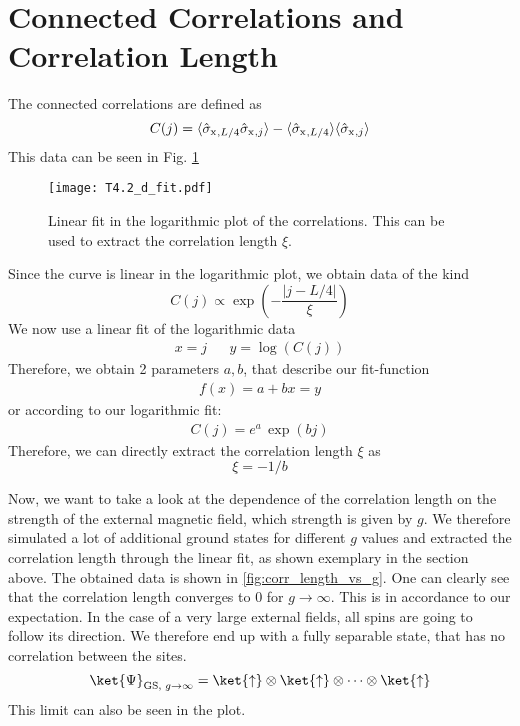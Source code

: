 \section{Connected Correlations and Correlation Length}
The connected correlations are defined as 
\begin{equation}
    C(j) = \langle \sigmax{}_{,L/4}\sigmax{}_{,j}\rangle - \langle \sigmax{}_{,L/4}\rangle\langle\sigmax{}_{,j}\rangle
\end{equation}
This data can be seen  in Fig. \ref{fig:connected-corr}
\begin{figure}[htbp]
    \centering
    \texttt{[image: T4.2\_d\_fit.pdf]}
    \caption{Linear fit in the logarithmic plot of the correlations. This can be used to extract the correlation length $\xi$.}
    \label{fig:connected-corr}
\end{figure}
Since the curve is linear in the logarithmic plot, we obtain data of the kind
\begin{equation}
    C(j) \propto \exp\left(-\frac{|j-L/4|}{\xi}\right)
\end{equation}
We now use a linear fit of the logarithmic data
\begin{align}
    x = j & &y = \log\left(C(j)\right)
\end{align}
Therefore, we obtain 2 parameters $a, b$, that describe our fit-function
\begin{align}
    f(x) = a + b x = y
\end{align}
or according to our logarithmic fit:
\begin{align}
    C(j) = e^a \, \exp\left(b j\right)
\end{align}
Therefore, we can directly extract the correlation length $\xi$ as
\begin{equation}
    \xi = -1/b
\end{equation}


Now, we want to take a look at the dependence of the correlation length on the strength of the external magnetic field, which strength is given by $g$.
We therefore simulated a lot of additional ground states for different $g$ values and extracted the correlation length through the linear fit, as shown exemplary in the section above.
The obtained data is shown in \autoref{fig:corr_length_vs_g}.
One can clearly see that the correlation length converges to 0 for $g\rightarrow\infty$.
This is in accordance to our expectation.
In the case of a very large external fields, all spins are going to follow its direction.
We therefore end up with a fully separable state, that has no correlation between the sites.%
\begin{equation}
    \ket{\Psi}_{\text{GS, } g\rightarrow\infty} = \ket{\uparrow} \otimes \ket{\uparrow} \otimes \dots \otimes \ket{\uparrow}
\end{equation}
This limit can also be seen in the plot.


